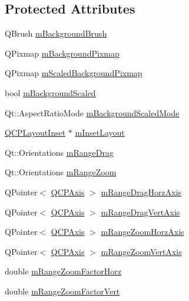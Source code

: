 \subsection*{Protected Attributes}
\begin{DoxyCompactItemize}
\item 
Q\+Brush \hyperlink{classQCPAxisRect_a5748e1a37f63c428e38b0a7724b46259}{m\+Background\+Brush}
\item 
Q\+Pixmap \hyperlink{classQCPAxisRect_a38fb1a15f43228a0c124553649303722}{m\+Background\+Pixmap}
\item 
Q\+Pixmap \hyperlink{classQCPAxisRect_aa74b9415598d59b49290e41e42d7ee27}{m\+Scaled\+Background\+Pixmap}
\item 
bool \hyperlink{classQCPAxisRect_a5ad835f0fae5d7cc5ada9e063641dbf1}{m\+Background\+Scaled}
\item 
Qt\+::\+Aspect\+Ratio\+Mode \hyperlink{classQCPAxisRect_a859fd368e794663e346b4f53f35078e9}{m\+Background\+Scaled\+Mode}
\item 
\hyperlink{classQCPLayoutInset}{Q\+C\+P\+Layout\+Inset} $\ast$ \hyperlink{classQCPAxisRect_a255240399e0fd24baad80cbbe46f698a}{m\+Inset\+Layout}
\item 
Qt\+::\+Orientations \hyperlink{classQCPAxisRect_aa9f107f66ca3469ad50ee6cea7c9e237}{m\+Range\+Drag}
\item 
Qt\+::\+Orientations \hyperlink{classQCPAxisRect_a215eff671d48df2edccc36e7f976f28c}{m\+Range\+Zoom}
\item 
Q\+Pointer$<$ \hyperlink{classQCPAxis}{Q\+C\+P\+Axis} $>$ \hyperlink{classQCPAxisRect_aeaaa38c6d2030dd5f84461e2596e41e3}{m\+Range\+Drag\+Horz\+Axis}
\item 
Q\+Pointer$<$ \hyperlink{classQCPAxis}{Q\+C\+P\+Axis} $>$ \hyperlink{classQCPAxisRect_a3e41dffec18987366f2a8ffd80689c12}{m\+Range\+Drag\+Vert\+Axis}
\item 
Q\+Pointer$<$ \hyperlink{classQCPAxis}{Q\+C\+P\+Axis} $>$ \hyperlink{classQCPAxisRect_ae22f882bab20518559f3fbb84243d0ab}{m\+Range\+Zoom\+Horz\+Axis}
\item 
Q\+Pointer$<$ \hyperlink{classQCPAxis}{Q\+C\+P\+Axis} $>$ \hyperlink{classQCPAxisRect_a8b9acd16a203a9692bd35a9465f54bc1}{m\+Range\+Zoom\+Vert\+Axis}
\item 
double \hyperlink{classQCPAxisRect_ad08d0250ed7b99de387d0ea6c7fd4dc1}{m\+Range\+Zoom\+Factor\+Horz}
\item 
double \hyperlink{classQCPAxisRect_a32f063629581d5bf82b12769940b34ad}{m\+Range\+Zoom\+Factor\+Vert}
\item 

\end{DoxyCompactItemize}
